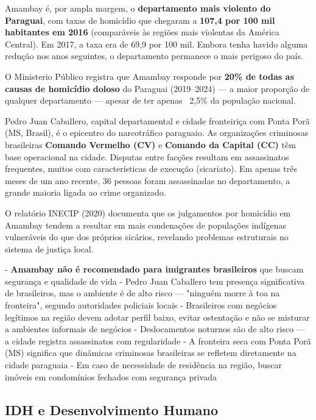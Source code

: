 Amambay é, por ampla margem, o \textbf{departamento mais violento do Paraguai}, com taxas de homicídio que chegaram a \textbf{107,4 por 100 mil habitantes em 2016} (comparáveis às regiões mais violentas da América Central). Em 2017, a taxa era de 69,9 por 100 mil. Embora tenha havido alguma redução nos anos seguintes, o departamento permanece o mais perigoso do país.

O Ministerio Público registra que Amambay responde por \textbf{20\% de todas as causas de homicídio doloso} do Paraguai (2019--2024) --- a maior proporção de qualquer departamento --- apesar de ter apenas ~2,5\% da população nacional.

Pedro Juan Caballero, capital departamental e cidade fronteiriça com Ponta Porã (MS, Brasil), é o epicentro do narcotráfico paraguaio. As organizações criminosas brasileiras \textbf{Comando Vermelho (CV)} e \textbf{Comando da Capital (CC)} têm base operacional na cidade. Disputas entre facções resultam em assassinatos frequentes, muitos com características de execução (sicariato). Em apenas três meses de um ano recente, 36 pessoas foram assassinadas no departamento, a grande maioria ligada ao crime organizado.

O relatório INECIP (2020) documenta que os julgamentos por homicídio em Amambay tendem a resultar em mais condenações de populações indígenas vulneráveis do que dos próprios sicários, revelando problemas estruturais no sistema de justiça local.


- \textbf{Amambay não é recomendado para imigrantes brasileiros} que buscam segurança e qualidade de vida
- Pedro Juan Caballero tem presença significativa de brasileiros, mas o ambiente é de alto risco --- "ninguém morre à toa na fronteira", segundo autoridades policiais locais
- Brasileiros com negócios legítimos na região devem adotar perfil baixo, evitar ostentação e não se misturar a ambientes informais de negócios
- Deslocamentos noturnos são de alto risco --- a cidade registra assassinatos com regularidade
- A fronteira seca com Ponta Porã (MS) significa que dinâmicas criminosas brasileiras se refletem diretamente na cidade paraguaia
- Em caso de necessidade de residência na região, buscar imóveis em condomínios fechados com segurança privada




\subsection{IDH e Desenvolvimento Humano}

